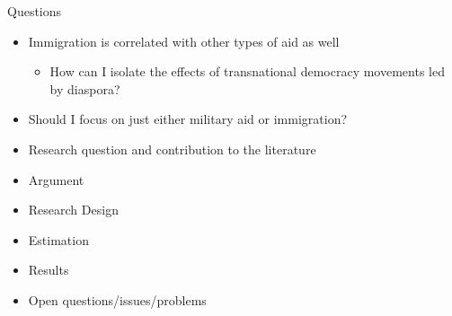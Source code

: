 \documentclass[ignorenonframetext,]{beamer}
\providecommand{\tightlist}{%
  \setlength{\itemsep}{0pt}\setlength{\parskip}{0pt}}
\begin{document}
\begin{frame}{Questions}
\protect\hypertarget{questions}{}

\begin{itemize}
\item
  Immigration is correlated with other types of aid as well

  \begin{itemize}
  \tightlist
  \item
    How can I isolate the effects of transnational democracy movements
    led by diaspora?
  \end{itemize}
\item
  Should I focus on just either military aid or immigration?
\item
  Research question and contribution to the literature
\item
  Argument
\item
  Research Design
\item
  Estimation
\item
  Results
\item
  Open questions/issues/problems
\end{itemize}

\end{frame}
\end{document}
